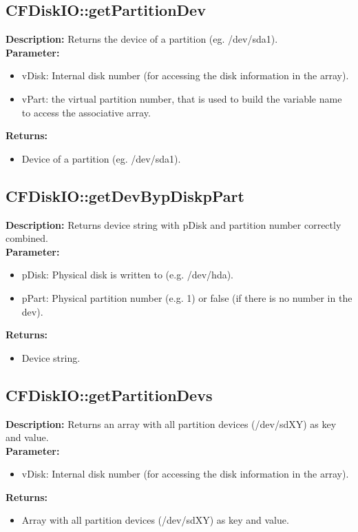 \subsection{CFDiskIO::getPartitionDev}
\textbf{Description:} Returns the device of a partition (eg. /dev/sda1).\\
\textbf{Parameter:}
\begin{itemize}
\item vDisk: Internal disk number (for accessing the disk information in the array).
\item vPart: the virtual partition number, that is used to build the variable name to access the associative array.
\end{itemize}
\textbf{Returns:}
\begin{itemize}
\item Device of a partition (eg. /dev/sda1).
\end{itemize}

\subsection{CFDiskIO::getDevBypDiskpPart}
\textbf{Description:} Returns device string with pDisk and partition number correctly combined.\\
\textbf{Parameter:}
\begin{itemize}
\item pDisk: Physical disk is written to (e.g. /dev/hda).
\item pPart: Physical partition number (e.g. 1) or false (if there is no number in the dev).
\end{itemize}
\textbf{Returns:}
\begin{itemize}
\item Device string.
\end{itemize}

\subsection{CFDiskIO::getPartitionDevs}
\textbf{Description:} Returns an array with all partition devices (/dev/sdXY) as key and value.\\
\textbf{Parameter:}
\begin{itemize}
\item vDisk: Internal disk number (for accessing the disk information in the array).
\end{itemize}
\textbf{Returns:}
\begin{itemize}
\item Array with all partition devices (/dev/sdXY) as key and value.
\end{itemize}

